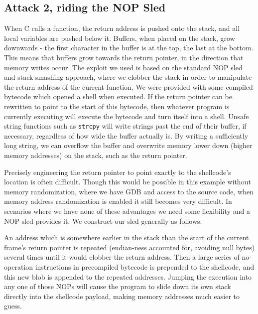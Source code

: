 \subsection{Attack 2, riding the NOP Sled}

When C calls a function, the return address is pushed onto the stack, and all local variables are pushed below it.
Buffers, when placed on the stack, grow downwards - the first character in the buffer is at the top, the last at the
bottom. This means that buffers grow towards the return pointer, in the direction that memory writes occur. The exploit
we used is based on the standard NOP sled and stack smashing approach, where we clobber the stack in order to manipulate
the return address of the current function. We were provided with some compiled bytecode which opened a shell when
executed. If the return pointer can be rewritten to point to the start of this bytecode, then whatever program is
currently executing will execute the bytecode and turn itself into a shell. Unsafe string functions such as {\tt strcpy}
will write strings past the end of their buffer, if necessary, regardless of how wide the buffer actually is. By writing
a sufficiently long string, we can overflow the buffer and overwrite memory lower down (higher memory addresses) on the
stack, such as the return pointer.

Precisely engineering the return pointer to point exactly to the shellcode's location is often difficult. Though this
would be possible in this example without memory randomization, where we have GDB and access to the source code, when
memory address randomization is enabled it still becomes very difficult. In scenarios where we have none of these
advantages we need some flexibility and a NOP sled provides it. We construct our sled generally as follows:

An address which is somewhere earlier in the stack than the start of the current frame's return pointer is repeated
(endian-ness accounted for, avoiding null bytes) several times until it would clobber the return address. Then a large
series of no-operation instructions in precompiled bytecode is prepended to the shellcode, and this new blob is appended
to the repeated addresses. Jumping the execution into any one of those NOPs will cause the program to slide down its own
stack directly into the shellcode payload, making memory addresses much easier to guess.

